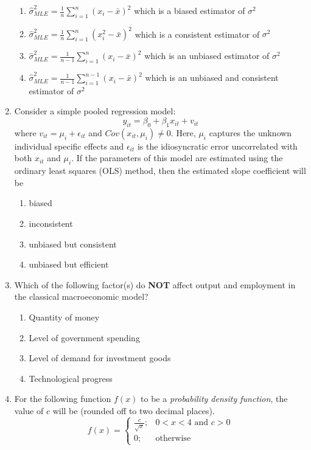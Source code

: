 \documentclass[journal,12pt,onecolumn]{exam}
\theoremstyle{remark}
\begin{document}
\begin{enumerate}
  \begin{enumerate}[label=(\Alph*)]
    \item $\hat{\sigma}^2_{MLE} = \frac{1}{n} \sum_{i=1}^n (x_i - \bar{x})^2$ which is a biased estimator of $\sigma^2$
    \item $\hat{\sigma}^2_{MLE} = \frac{1}{n} \sum_{i=1}^n (x_i^2 - \bar{x})^2$ which is a consistent estimator of $\sigma^2$
    \item $\hat{\sigma}^2_{MLE} = \frac{1}{n-1} \sum_{i=1}^n (x_i - \bar{x})^2$ which is an unbiased estimator of $\sigma^2$
    \item $\hat{\sigma}^2_{MLE} = \frac{1}{n-1} \sum_{i=1}^{n-1} (x_i - \bar{x})^2$ which is an unbiased and consistent estimator of $\sigma^2$
  \end{enumerate}
\newpage
  \item Consider a simple pooled regression model: 
  \[
  y_{it} = \beta_0 + \beta_1 x_{it} + v_{it}
  \]
  where $v_{it} = \mu_i + \epsilon_{it}$ and $Cov(x_{it}, \mu_i) \neq 0$. Here, $\mu_i$ captures the unknown individual specific effects and $\epsilon_{it}$ is the idiosyncratic error uncorrelated with both $x_{it}$ and $\mu_i$. If the parameters of this model are estimated using the ordinary least squares (OLS) method, then the estimated slope coefficient will be

  \begin{enumerate}[label=(\Alph*)]
    \item biased
    \item inconsistent
    \item unbiased but consistent
    \item unbiased but efficient
  \end{enumerate}

\item Which of the following factor(s) do \textbf{NOT} affect output and employment in the classical macroeconomic model?
  \begin{enumerate}[label=(\Alph*)]
    \item Quantity of money
    \item Level of government spending
    \item Level of demand for investment goods
    \item Technological progress
  \end{enumerate}
  
  \item For the following function $f(x)$ to be a \textit{probability density function}, the value of $c$ will be \underline{\hspace{3cm}} (rounded off to two decimal places).
  \[
  f(x) = \begin{cases}
  \frac{c}{\sqrt{x}}; & 0 < x < 4 \text{ and } c > 0 \\
  0; & \text{otherwise}
  \end{cases}
  \]
  

\end{enumerate}
\end{document}
